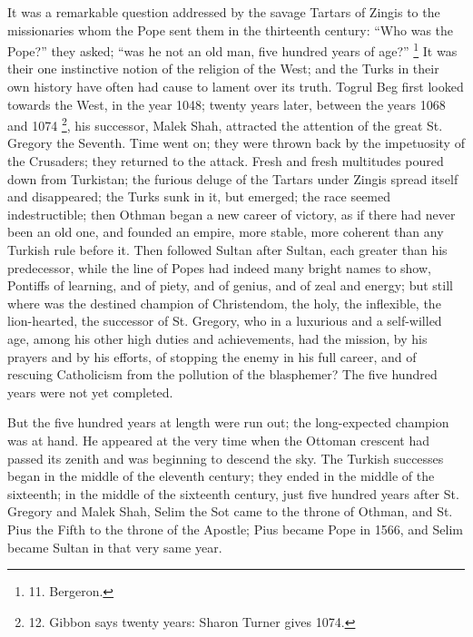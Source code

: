 It was a remarkable question
addressed by the savage Tartars of Zingis to the missionaries whom the
Pope sent them in the thirteenth century: ``Who was the Pope?'' they
asked; ``was he not an old man, five hundred years of age?'' \footnote{11.
Bergeron.} It was their one instinctive notion of the religion of the
West; and the Turks in their own history have often had cause to
lament over its truth. Togrul Beg first looked towards the West, in
the year 1048; twenty years later, between the years 1068 and 1074 \footnote{12.
Gibbon says twenty years: Sharon Turner gives 1074.}, his successor, Malek Shah, attracted the attention of the
great St. Gregory the Seventh. Time went on; they were thrown back by
the impetuosity of the Crusaders; they returned to the attack. Fresh
and fresh multitudes poured down from Turkistan; the furious deluge of
the Tartars under Zingis spread itself and disappeared; the Turks sunk
in it, but emerged; the race seemed indestructible; then Othman began
a new career of victory, as if there had never been an old one, and
founded an empire, more stable, more coherent than any Turkish rule
before it. Then followed Sultan after Sultan, each greater than his
predecessor, while the line of Popes had indeed many bright names to
show, Pontiffs of learning, and of piety, and of genius, and of zeal
and energy; but still where was the destined champion of Christendom,
the holy, the inflexible, the lion-hearted, the successor of St.
Gregory, who in a luxurious and a self-willed age, among his other
high duties and achievements, had the mission, by his prayers and by
his efforts, of stopping the enemy in his full career, and of rescuing
Catholicism from the pollution of the blasphemer? The five hundred
years were not yet completed.

But the five hundred years at
length were run out; the long-expected champion was at hand. He
appeared at the very time when the Ottoman crescent had passed
its zenith and was beginning to descend the sky. The Turkish successes
began in the middle of the eleventh century; they ended in the middle
of the sixteenth; in the middle of the sixteenth century, just five
hundred years after St. Gregory and Malek Shah, Selim the Sot came to
the throne of Othman, and St. Pius the Fifth to the throne of the
Apostle; Pius became Pope in 1566, and Selim became Sultan in that
very same year.

